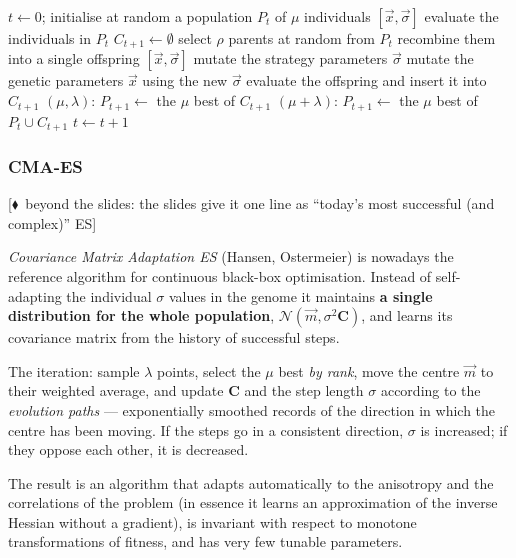 \documentclass[11pt,a4paper]{article}
\theoremstyle{definition}
\providecommand{\uv}[1]{``#1''}
\newcommand{\mimoq}[1]{\textcolor{markcol}{\textsf{\footnotesize[$\blacklozenge$~beyond the slides: #1]}}}
\begin{document}
\begin{algorithm}[!ht]
\caption{The general ES cycle}
\begin{algorithmic}[1]
\State $t \gets 0$; initialise at random a population $P_t$ of $\mu$ individuals $[\vec x, \vec\sigma]$
\State evaluate the individuals in $P_t$
  \State $C_{t+1} \gets \emptyset$
    \State select $\rho$ parents at random from $P_t$
    \State recombine them into a single offspring $[\vec x, \vec\sigma]$
    \State mutate the strategy parameters $\vec\sigma$
    \State mutate the genetic parameters $\vec x$ using the new $\vec\sigma$
    \State evaluate the offspring and insert it into $C_{t+1}$
  \EndFor
  \State $(\mu,\lambda)$: $P_{t+1} \gets$ the $\mu$ best of $C_{t+1}$
  \State $(\mu+\lambda)$: $P_{t+1} \gets$ the $\mu$ best of $P_t \cup C_{t+1}$
  \State $t \gets t+1$
\EndWhile
\end{algorithmic}
\end{algorithm}

\subsubsection{CMA-ES}

\noindent\mimoq{the slides give it one line as \uv{today's most successful (and complex)} ES}

\begin{defbox}
\emph{Covariance Matrix Adaptation ES} (Hansen, Ostermeier) is nowadays the reference
algorithm for continuous black-box optimisation. Instead of self-adapting the individual
$\sigma$ values in the genome it maintains \textbf{a single distribution for the whole
population}, $\mathcal{N}(\vec m, \sigma^2 \mathbf{C})$, and learns its covariance matrix
from the history of successful steps.

The iteration: sample $\lambda$ points, select the $\mu$ best \emph{by rank}, move the centre
$\vec m$ to their weighted average, and update $\mathbf{C}$ and the step length $\sigma$
according to the \emph{evolution paths} --- exponentially smoothed records of the direction
in which the centre has been moving. If the steps go in a consistent direction, $\sigma$ is
increased; if they oppose each other, it is decreased.
\end{defbox}

The result is an algorithm that adapts automatically to the anisotropy and the correlations
of the problem (in essence it learns an approximation of the inverse Hessian without a
gradient), is invariant with respect to monotone transformations of fitness, and has very few
tunable parameters.
\end{document}
